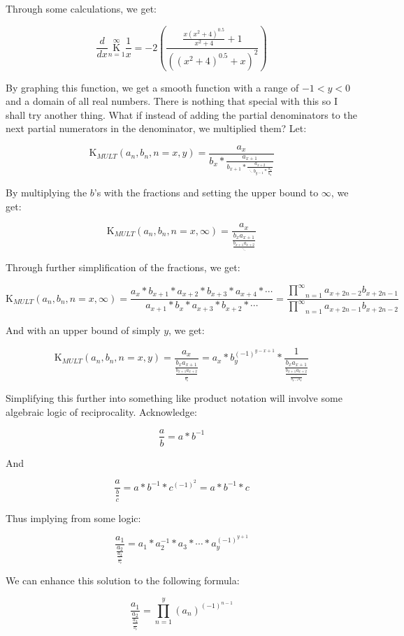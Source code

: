 \documentclass{article}
\begin{document}
Through some calculations, we get:

$$\frac{d}{dx} \underset{n=1}{\overset{\infty}{\mathrm K}} \frac{1}{x}=-2(\frac{\frac{x(x^2+4)^{0.5}}{x^2+4}+1}{((x^2+4)^{0.5}+x)^2})$$

By graphing this function, we get a smooth function with a range of $-1<y<0$ and a domain of all real numbers. There is nothing that special with this so I shall try another thing. What if instead of adding the partial denominators to the next partial numerators in the denominator, we multiplied them? Let:

$$\text{K}_{MULT}(a_n,b_n,n=x,y)=\frac{a_x}{b_x*\frac{a_{x+1}}{b_{x+1}*\frac{a_{x+2}}{\ddots b_{y-1}*\frac{a_y}{b_y}}}}$$

By multiplying the $b$’s with the fractions and setting the upper bound to $\infty$, we get:

$$\text{K}_{MULT}(a_n,b_n,n=x,\infty)=\frac{a_x}{\frac{b_xa_{x+1}}{\frac{b_{x+1}a_{x+2}}{\ddots}}}$$

Through further simplification of the fractions, we get:

$$\text{K}_{MULT}(a_n,b_n,n=x,\infty)=\frac{a_x*b_{x+1}*a_{x+2}*b_{x+3}*a_{x+4}*\cdots}{a_{x+1}*b_{x}*a_{x+3}*b_{x+2}*\cdots}=\frac{\underset{n=1}{\overset{\infty}{\prod}} a_{x+2n-2}b_{x+2n-1}}{\underset{n=1}{\overset{\infty}{\prod}} a_{x+2n-1}b_{x+2n-2}}$$

And with an upper bound of simply $y$, we get:

$$\text{K}_{MULT}(a_n,b_n,n=x,y)=\frac{a_x}{\frac{b_xa_{x+1}}{\frac{b_{x+1}a_{x+2}}{\frac{\ddots}{b_y}}}}=a_x*b_y^{(-1)^{y-x+1}}*\frac{1}{\frac{b_xa_{x+1}}{\frac{b_{x+1}a_{x+2}}{\frac{\ddots}{b_{y-1}a_y}}}}$$

Simplifying this further into something like product notation will involve some algebraic logic of reciprocality. Acknowledge:

$$\frac{a}{b}=a*b^{-1}$$

And

$$\frac{a}{\frac{b}{c}}=a*b^{-1}*c^{(-1)^2}=a*b^{-1}*c$$

Thus implying from some logic:

$$\frac{a_1}{\frac{a_2}{\frac{a_3}{\frac{\ddots}{a_y}}}}=a_1*a_2^{-1}*a_3*\cdots*a_y^{(-1)^{y+1}}$$

We can enhance this solution to the following formula:

$$\frac{a_1}{\frac{a_2}{\frac{a_3}{\frac{\ddots}{a_y}}}}=\underset{n=1}{\overset{y}{\prod}} (a_n)^{(-1)^{n-1}}$$
\end{document}
